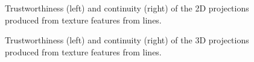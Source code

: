 
\clearpage
\begin{figure}[H]
	\centering
	\caption{Trustworthiness (left) and continuity (right) of the 2D projections produced from texture features from lines.}\label{fig:TC_2d_texture}
\end{figure}

\begin{figure}[H]
	\centering
	\caption{Trustworthiness (left) and continuity (right) of the 3D projections produced from texture features from lines.}\label{fig:TC_3d_texture}
\end{figure}

